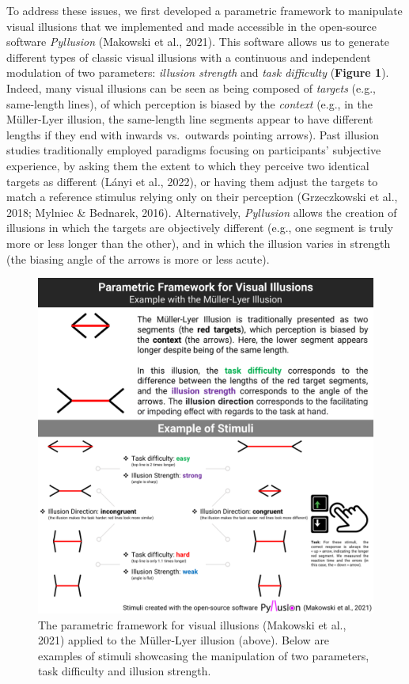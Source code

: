 \documentclass[
  man,floatsintext]{apa6}
\begin{document}
To address these issues, we first developed a parametric framework to manipulate visual illusions that we implemented and made accessible in the open-source software \emph{Pyllusion} (Makowski et al., 2021). This software allows us to generate different types of classic visual illusions with a continuous and independent modulation of two parameters: \emph{illusion strength} and \emph{task difficulty} (\textbf{Figure 1}). Indeed, many visual illusions can be seen as being composed of \emph{targets} (e.g., same-length lines), of which perception is biased by the \emph{context} (e.g., in the Müller-Lyer illusion, the same-length line segments appear to have different lengths if they end with inwards vs.~outwards pointing arrows). Past illusion studies traditionally employed paradigms focusing on participants' subjective experience, by asking them the extent to which they perceive two identical targets as different (Lányi et al., 2022), or having them adjust the targets to match a reference stimulus relying only on their perception (Grzeczkowski et al., 2018; Mylniec \& Bednarek, 2016). Alternatively, \emph{Pyllusion} allows the creation of illusions in which the targets are objectively different (e.g., one segment is truly more or less longer than the other), and in which the illusion varies in strength (the biasing angle of the arrows is more or less acute).

\begin{figure}
\includegraphics[width=1\linewidth]{../figures/Figure1} \caption{The parametric framework for visual illusions (Makowski et al., 2021) applied to the Müller-Lyer illusion (above). Below are examples of stimuli showcasing the manipulation of two parameters, task difficulty and illusion strength.}\label{fig:unnamed-chunk-2}
\end{figure}
\end{document}
